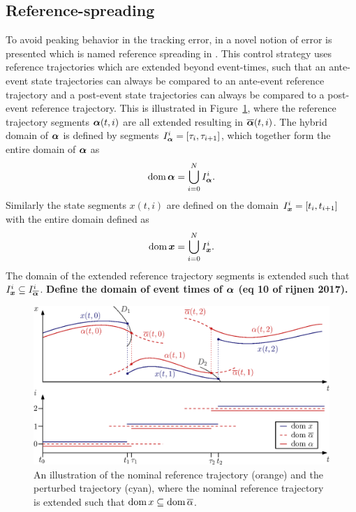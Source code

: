 \documentclass[../DC2017114Bouma.tex]{subfiles}
\begin{document}
\subsection{Reference-spreading}
To avoid peaking behavior in the tracking error, in \cite{Saccon2014} a novel notion of error is presented which is named reference spreading in \cite{Rijnen2016}. This control strategy uses reference trajectories which are extended beyond event-times, such that an ante-event state trajectories can always be compared to an ante-event reference trajectory and a post-event state trajectories can always be compared to a post-event reference trajectory. This is illustrated in Figure~\ref{fig:3refspread}, where the reference trajectory segments $\boldsymbol{\alpha}(t,i)$ are all extended resulting in $\overline{\boldsymbol{\alpha}}(t,i)$. The hybrid domain \cite{Goebel2009} of $\boldsymbol{\alpha}$ is defined by segments $I^i_{\boldsymbol{\alpha}} = [\tau_i,\tau_{i+1}]$, which together form the entire domain of $\boldsymbol{\alpha}$ as
\begin{align}
\operatorname{\textnormal{dom}}\boldsymbol{\alpha} = \bigcup^N_{i=0}I_{\boldsymbol{\alpha}}^i.
\end{align}
%
Similarly the state segments $x(t,i)$ are defined on the domain $I^i_{\boldsymbol{x}} = [t_i,t_{i+1}]$ with the entire domain defined as
\begin{align}
\operatorname{\textnormal{dom}}{\boldsymbol{x}} = \bigcup^N_{i=0}I_{{\boldsymbol{x}}}^i.
\end{align}
The domain of the extended reference trajectory segments is extended such that $I_{{\boldsymbol{x}}}^i\subseteq I_{\overline{\boldsymbol{\alpha}}}^i$. \textbf{Define the domain of event times of $\boldsymbol{\alpha}$ (eq 10 of rijnen 2017).}

\begin{figure}[h]
\centering
\includegraphics[width=.9\textwidth]{refspreaddom.eps}\caption{An illustration of the nominal reference trajectory (orange) and the perturbed trajectory (cyan), where the nominal reference trajectory is extended such that $\operatorname{\textnormal{dom}} x\subseteq\operatorname{\textnormal{dom}} \overline{\alpha}$.} \label{fig:3refspread}
\end{figure}
\end{document}

